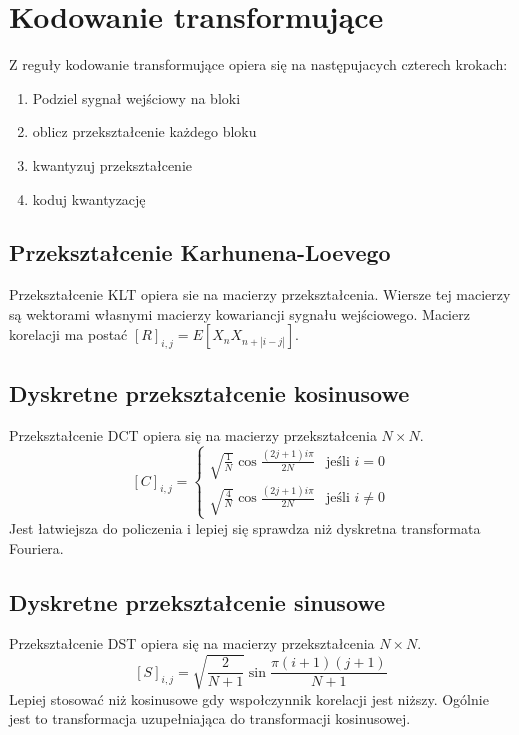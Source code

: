 \documentclass{../notatki}
\begin{document}
\section{Kodowanie transformujące}

Z reguły kodowanie transformujące opiera się na następujacych czterech krokach:
\begin{enumerate}
\item Podziel sygnał wejściowy na bloki
\item oblicz przekształcenie każdego bloku
\item kwantyzuj przekształcenie
\item koduj kwantyzację
\end{enumerate}

\subsection{Przekształcenie Karhunena-Loevego}

Przekształcenie KLT opiera sie na macierzy przekształcenia.
Wiersze tej macierzy są wektorami własnymi macierzy kowariancji sygnału
wejściowego. Macierz korelacji ma postać $[R]_{i,j} = E[X_nX_{n + |i - j|}]$.

\subsection{Dyskretne przekształcenie kosinusowe}

Przekształcenie DCT opiera się na macierzy przekształcenia $N \times N$.
$$
[C]_{i,j} =
\begin{cases}
\sqrt{\frac{1}{N}} \cos \frac{(2j + 1)i\pi}{2N} & \text{jeśli } i = 0 \\
\sqrt{\frac{4}{N}} \cos \frac{(2j + 1)i\pi}{2N} & \text{jeśli } i \neq 0
\end{cases}
$$
Jest łatwiejsza do policzenia i lepiej się sprawdza niż dyskretna
transformata Fouriera.

\subsection{Dyskretne przekształcenie sinusowe}

Przekształcenie DST opiera się na macierzy przekształcenia $N \times N$.
$$
[S]_{i,j} = \sqrt{\frac{2}{N + 1}} \sin \frac{\pi(i + 1)(j + 1)}{N + 1}
$$
Lepiej stosować niż kosinusowe gdy wspołczynnik korelacji jest niższy.
Ogólnie jest to transformacja uzupełniająca do transformacji kosinusowej.
\end{document}
